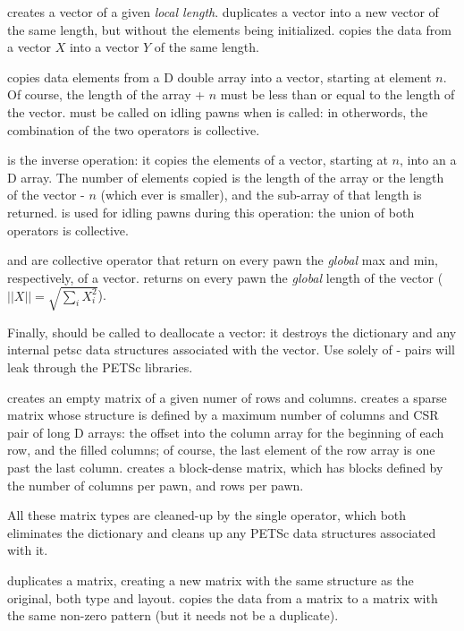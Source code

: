  creates a vector of a given \emph{local
  length}.  duplicates a vector into a new vector of
the same length, but without the elements being
initialized.  copies the data from a vector $X$
into a vector $Y$ of the same length.

 copies data elements from a D double array into
a vector, starting at element $n$. Of course, the length of the array
+ $n$ must be less than or equal to the length of the
vector.  must be called on idling pawns when
 is called: in otherwords, the combination of the
two operators is collective.

 is the inverse operation: it copies the
elements of a vector, starting at $n$, into an a D array. The number
of elements copied is the length of the array or the length of the
vector - $n$ (which ever is smaller), and the sub-array of that length
is returned.  is used for idling pawns during
this operation: the union of both operators is collective.

 and  are collective operator that
return on every pawn the \emph{global} max and min, respectively, of a
vector.  returns on every pawn the \emph{global}
length of the vector ($\scriptstyle||X||=\sqrt{\sum_i X_i^2}$).

Finally,  should be called to deallocate a
vector: it destroys the dictionary and any internal petsc data
structures associated with the vector. Use solely of
- pairs will leak through the PETSc libraries.

 creates an empty matrix of a given numer
of rows and columns.  creates a sparse
matrix whose structure is defined by a maximum number of columns and
CSR pair of long D arrays: the offset into the column array for the
beginning of each row, and the filled columns; of course, the last
element of the row array is one past the last
column.  creates a block-dense matrix,
which has blocks defined by the number of columns per pawn, and rows
per pawn.

All these matrix types are cleaned-up by the single
 operator, which both eliminates the dictionary
and cleans up any PETSc data structures associated with it.

 duplicates a matrix, creating a new matrix with the
same structure as the original, both type and
layout.  copies the data from a matrix to a matrix
with the same non-zero pattern (but it needs not be a duplicate).

